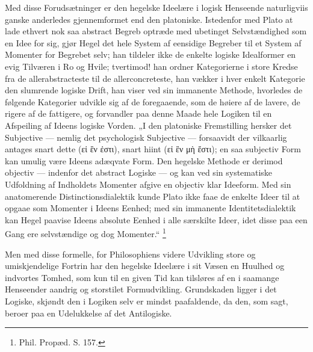 \documentclass[11pt]{book}
\newcommand{\opage}[1]{\marginnote{\footnotesize\textit{[#1]}}}
\begin{document}
Med disse Forudsætninger er den hegelske Ideelære i logisk
Henseende naturligviis ganske anderledes gjennemformet end den
platoniske. Istedenfor med Plato at lade ethvert nok saa abstract
Begreb optræde med ubetinget Selvstændighed som en Idee for sig,
gjør Hegel det hele System af eensidige Begreber til et System af
Momenter for Begrebet selv; han tildeler ikke de enkelte logiske
Idealformer en evig Tilværen i Ro og Hvile; tvertimod! han ordner
Kategorierne i store Kredse fra de allerabstracteste til de
allerconcreteste, han vækker i hver enkelt Kategorie den slumrende
logiske Drift, han viser ved sin immanente Methode, hvorledes de
følgende Kategorier udvikle sig af de foregaaende, som de høiere af
de lavere, de rigere af de fattigere, og forvandler paa denne Maade
hele Logiken til en Afspeiling af Ideens logiske Vorden. „I den
platoniske Fremstilling hersker det Subjective --- nemlig det
psychologisk Subjective --- forsaavidt der vilkaarlig antages snart
dette (εἰ ἓν ἐστι), snart hiint (εἰ ἓν μὴ ἔστι); en saa subjectiv
Form kan umulig være Ideens adæqvate Form. Den
\opage{187} \setcounter{footnote}{0}%
hegelske Methode er derimod objectiv --- indenfor det abstract
Logiske --- og kan ved sin systematiske Udfoldning af Indholdets
Momenter afgive en objectiv klar Ideeform. Med sin anatomerende
Distinctionsdialektik kunde Plato ikke faae de enkelte Ideer til at
opgaae som Momenter i Ideens Eenhed; med sin immanente
Identitetsdialektik kan Hegel paavise Ideens absolute Eenhed i alle
særskilte Ideer, idet disse paa een Gang ere selvstændige og dog
Momenter.“%
\footnote{Phil. Propæd. S. 157.}

Men med disse formelle, for Philosophiens videre Udvikling store og
umiskjendelige Fortrin har den hegelske Ideelære i sit Væsen en
Huulhed og indvortes Tomhed, som kun til en given Tid kan tilsløres
af en i saamange Henseender aandrig og storstilet Formudvikling.
Grundskaden ligger i det Logiske, skjøndt den i Logiken selv er
mindst paafaldende, da den, som sagt, beroer paa en Udelukkelse af
det Antilogiske.
\end{document}
